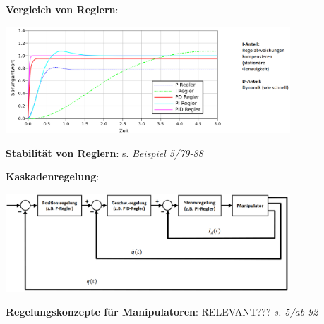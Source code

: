 \textbf{Vergleich von Reglern}:
\begin{center}
	\includegraphics[width=0.8\textwidth]{images/r-vergleich.png}
\end{center}

\textbf{Stabilität von Reglern}: s. \textit{Beispiel 5/79-88}

\textbf{Kaskadenregelung}:
\begin{center}
	\includegraphics[width=0.8\textwidth]{images/kaskadenregelung.png}
\end{center}


\textbf{Regelungskonzepte für Manipulatoren}: RELEVANT??? \textit{s. 5/ab 92}